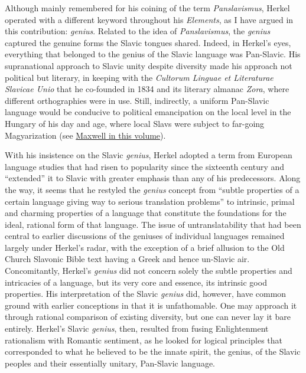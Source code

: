 Although mainly remembered for his coining of the term \textit{Panslavismus}, Herkel operated with a different keyword throughout his \textit{Elements}, as I have argued in this contribution: \textit{genius}. Related to the idea of \textit{Panslavismus}, the \textit{genius} captured the genuine forms the Slavic tongues shared. Indeed, in Herkel’s eyes, everything that belonged to the genius of the Slavic language was Pan-Slavic. His supranational approach to Slavic unity despite diversity made his approach not political but literary, in keeping with the \textit{Cultorum Linguae et Literaturae Slavicae Unio} that he co-founded in 1834 and its literary almanac \textit{Zora}, where different orthographies were in use. Still, indirectly, a uniform Pan-Slavic language would be conducive to political emancipation on the local level in the Hungary of his day and age, where local Slavs were subject to far-going Magyarization (see \hyperref[sec:1.2]{Maxwell in this volume}).

With his insistence on the Slavic \textit{genius}, Herkel adopted a term from European language studies that had risen to popularity since the sixteenth century and “extended” it to Slavic with greater emphasis than any of his predecessors. Along the way, it seems that he restyled the \textit{genius} concept from “subtle properties of a certain language giving way to serious translation problems” \citep[92]{van_hal_genie_2013} to intrinsic, primal and charming properties of a language that constitute the foundations for the ideal, rational form of that language. The issue of untranslatability that had been central to earlier discussions of the geniuses of individual languages remained largely under Herkel’s radar, with the exception of a brief allusion to the Old Church Slavonic Bible text having a Greek and hence un-Slavic air. Concomitantly, Herkel’s \textit{genius} did not concern solely the subtle properties and intricacies of a language, but its very core and essence, its intrinsic good properties. His interpretation of the Slavic \textit{genius} did, however, have common ground with earlier conceptions in that it is unfathomable. One may approach it through rational comparison of existing diversity, but one can never lay it bare entirely. Herkel’s Slavic \textit{genius}, then, resulted from fusing Enlightenment rationalism with Romantic sentiment, as he looked for logical principles that corresponded to what he believed to be the innate spirit, the genius, of the Slavic peoples and their essentially unitary, Pan-Slavic language.
